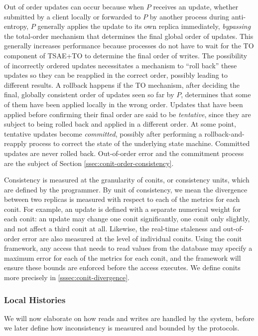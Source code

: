 \documentclass[]             %
{NASA}                       %
\theoremstyle{definition}
\begin{document}
Out of order updates can occur because when $P$ receives an update,
whether submitted by a client locally or forwarded to $P$ by another
process during anti-entropy, $P$ generally applies the update to its
own replica immediately, \emph{bypassing} the total-order mechanism
that determines the final global order of updates. This generally
increases performance because processes do not have to wait for the TO
component of TSAE+TO to determine the final order of writes. The
possibility of incorrectly ordered updates necessitates a mechanism to
``roll back'' these updates so they can be reapplied in the correct
order, possibly leading to different results. A rollback happens if
the TO mechanism, after deciding the final, globally consistent order
of updates seen so far by $P$, determines that some of them have been
applied locally in the wrong order. Updates that have been applied
before confirming their final order are said to be \emph{tentative},
since they are subject to being rolled back and applied in a different
order. At some point, tentative updates become \emph{committed},
possibly after performing a rollback-and-reapply process to correct
the state of the underlying state machine. Committed updates are never
rolled back. Out-of-order error and the commitment process are the
subject of Section \ref{ssec:conit-order-consistency}.

Consistency is measured at the granularity of conits, or consistency
units, which are defined by the programmer. By unit of consistency, we
mean the divergence between two replicas is measured with respect to
each of the metrics for each conit. For example, an update is defined
with a separate numerical weight for each conit: an update may change
one conit significantly, one conit only slightly, and not affect a
third conit at all. Likewise, the real-time staleness and out-of-order
error are also measured at the level of individual conits. Using the
conit framework, any access that needs to read values from the
database may specify a maximum error for each of the metrics for each
conit, and the framework will ensure these bounds are enforced before
the access executes. We define conits more precisely in
\ref{sssec:conit-divergence}.

\subsubsection{Local Histories}
\label{sssec:handling-accesses}
We will now elaborate on how reads and writes are handled by the
system, before we later define how inconsistency is measured and
bounded by the protocols.
\end{document}
